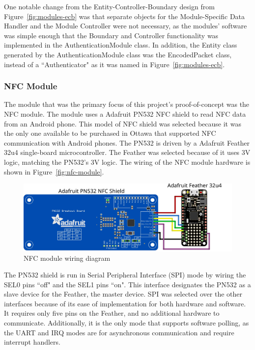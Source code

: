 \documentclass[12pt]{report}
\let\Oldsubsubsection\subsubsection
\renewcommand{\subsubsection}{\FloatBarrier\Oldsubsubsection}
\begin{document}
One notable change from the Entity-Controller-Boundary design from Figure~\ref{fig:modules-ecb} was that separate 
objects for the Module-Specific Data Handler and the Module Controller were not necessary, as the modules' software was 
simple enough that the Boundary and Controller functionality was implemented in the AuthenticationModule class. In 
addition, the Entity class generated by the AuthenticationModule class was the EncodedPacket class, instead of a 
``Authenticator" as it was named in Figure~\ref{fig:modules-ecb}.

\subsubsection{NFC Module} \label{nfc-modules}

The module that was the primary focus of this project's proof-of-concept was the NFC module. The module uses a Adafruit 
PN532 NFC shield to read NFC data from an Android phone. This model of NFC shield was selected because it was the only 
one available to be purchased in Ottawa that supported NFC communication with Android phones. The PN532 is driven by a 
Adafruit Feather 32u4 single-board microcontroller. The Feather was selected because of it uses 3V logic, matching the 
PN532's 3V logic. The wiring of the NFC module hardware is shown in Figure~\ref{fig:nfc-module}.

\begin{figure}
    \includegraphics[width=\textwidth]{Diagrams/Hardware-Diagrams/nfc_module}
    \caption{NFC module wiring diagram}
    \label{fig:nfc-module-wiring}
\end{figure}
The PN532 shield is run in Serial Peripheral Interface (SPI) mode by wiring the SEL0 pins ``off" and the SEL1 pins 
``on". This interface designates the PN532 as a slave device for the Feather, the master device. SPI was selected over 
the other interfaces because of its ease of implementation for both hardware and software. It requires only five pins on 
the Feather, and no additional hardware to communicate. Additionally, it is the only mode that supports software 
polling, as the UART and IRQ modes are for asynchronous communication and require interrupt handlers.
\end{document}
